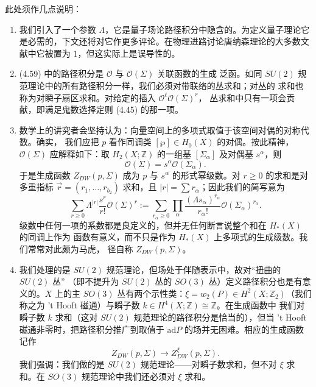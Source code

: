 此处须作几点说明：

\begin{enumerate}[label=\arabic*., leftmargin=2.2em]
  \item 我们引入了一个参数 $\Lambda$，它是量子场论路径积分中隐含的。为定义量子理论它
    是必需的，下文还将对它作更多评论。在物理进路讨论唐纳森理论的大多数文献中它被置为
    $1$，但这实际上是误导性的。

  \item (4.59) 中的路径积分是 $\mathcal{O}$ 与 $\mathcal{O}(\Sigma)$ 关联函数的生成
    泛函。如同 $SU(2)$ 规范理论中的所有路径积分一样，我们必须对带联络的丛求和；对丛的
    求和也称为对瞬子扇区求和。对给定的插入 $\mathcal{O}^{\ell}\mathcal{O}(\Sigma)^{r}$，
    丛求和中只有一项会贡献，即满足鬼数选择定则 (4.45) 的那一项。

  \item 数学上的讲究者会坚持认为：向量空间上的多项式取值于该空间对偶的对称代数。确实，
    我们应把 $p$ 看作同调类 $[\wp]\in H_{0}(X)$ 的对偶。按此精神，$\mathcal{O}(\Sigma)$
    应解释如下：取 $H_{2}(X;\mathbb{Z})$ 的一组基 $[\Sigma_{\alpha}]$ 及对偶基
    $s^{\alpha}$，则
    \begin{equation}
      \mathcal{O}(\Sigma)=s^{\alpha}\mathcal{O}(\Sigma_{\alpha}).
      \tag{4.60}
    \end{equation}
    于是生成函数 $Z_{DW}(p,\Sigma)$ 成为 $p$ 与 $s^{\alpha}$ 的形式幂级数。对 $r\ge0$
    的求和是对多重指标 $\vec r=(r_{1},\dots,r_{b_{2}})$ 求和，且
    $|r|=\sum r_{\alpha}$；因此我们的简写意为
    \begin{equation}
      \sum_{r\ge0}\Lambda^{|r|}\frac{s^{r}}{r!}\mathcal{O}(\Sigma)^{r}
      :=\sum_{r_{\alpha}\ge0}\prod_{\alpha}
      \frac{(\Lambda s_{\alpha})^{r_{\alpha}}}{r_{\alpha}!}
      \mathcal{O}(\Sigma_{\alpha})^{r_{\alpha}}.
      \tag{4.61}
    \end{equation}
    级数中任何一项的系数都是良定义的，但并无任何断言说整个和在 $H_{*}(X)$ 的同调上作为
    函数有意义，而不只是作为 $H_{*}(X)$ 上多项式的生成级数。我们常常对此颇为马虎，
    径自称 $Z_{DW}(p,\Sigma)$。

  \item 我们处理的是 $SU(2)$ 规范理论，但场处于伴随表示中，故对“扭曲的 $SU(2)$ 丛”
    （即不提升为 $SU(2)$ 丛的 $SO(3)$ 丛）定义路径积分也是有意义的。$X$ 上的主
    $SO(3)$ 丛有两个示性类：$\xi=w_{2}(P)\in H^{2}(X;\mathbb{Z}_{2})$（我们称之为
    't Hooft 磁通）与瞬子数 $k\in H^{4}(X;\mathbb{Z})\cong\mathbb{Z}$。在生成函数中
    我们对瞬子数 $k$ 求和（这对 $SU(2)$ 规范理论的路径积分是恰当的），但当 't Hooft
    磁通非零时，把路径积分推广到取值于 $\mathrm{ad}P$ 的场并无困难。相应的生成函数
    记作
    \begin{equation}
      Z_{DW}(p,\Sigma)\to Z^{\xi}_{DW}(p,\Sigma).
      \tag{4.62}
    \end{equation}
    我们强调：我们做的是 $SU(2)$ 规范理论——对瞬子数求和，但不对 $\xi$ 求和。在
    $SO(3)$ 规范理论中我们还必须对 $\xi$ 求和。


\end{enumerate}
